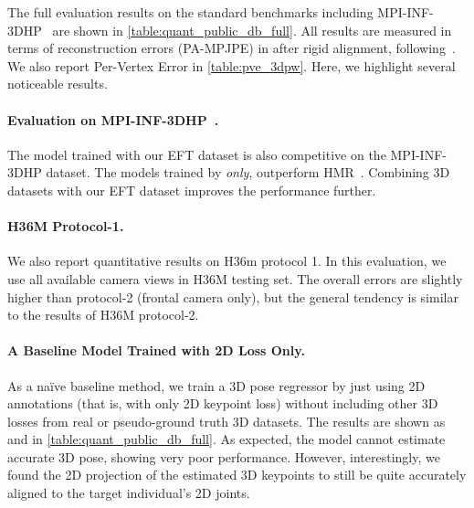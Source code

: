 \documentclass[10pt,twocolumn,letterpaper]{article}
\begin{document}
	The full evaluation results on the standard benchmarks including MPI-INF-3DHP~\cite{mehta2017monocular} are shown in \cref{table:quant_public_db_full}. All results are measured in terms of reconstruction errors (PA-MPJPE) in  after rigid alignment, following~\cite{kanazawa2018end, kolotouros2019spin}. We also report Per-Vertex Error in \cref{table:pve_3dpw}. Here, we highlight several noticeable results. 
	
	\paragraph{Evaluation on MPI-INF-3DHP~\cite{mehta2017monocular}.} The model trained with our EFT dataset is also competitive on the MPI-INF-3DHP dataset. The models trained by \emph{only},   outperform HMR~\cite{kanazawa2018end}. Combining 3D datasets with our EFT dataset improves the performance further. 
	
	
	\paragraph{H36M Protocol-1.} We also report quantitative results on H36m protocol 1. In this evaluation, we use all available camera views in H36M testing set. The overall errors are slightly higher than protocol-2 (frontal camera only), but the general tendency is similar to the results of H36M protocol-2. 
	
	
	\paragraph{A Baseline Model Trained with 2D Loss Only.} As a na\"ive baseline method, we train a 3D pose regressor by just using 2D annotations (that is, with only 2D keypoint loss) without including other 3D losses from real or pseudo-ground truth 3D datasets. The results are shown as  and  in \cref{table:quant_public_db_full}. As expected, the model cannot estimate accurate 3D pose, showing very poor performance. However, interestingly, we found the 2D projection of the estimated 3D keypoints to still be quite accurately aligned to the target individual's 2D joints. 
	
	
	
\end{document}
